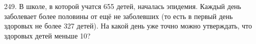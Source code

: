 249. В школе, в которой учатся 655 детей, началась эпидемия. Каждый день заболевает более половины от ещё не заболевших (то есть в первый день здоровых не более 327 детей). На какой день уже точно можно утверждать, что здоровых детей меньше 10?\\
